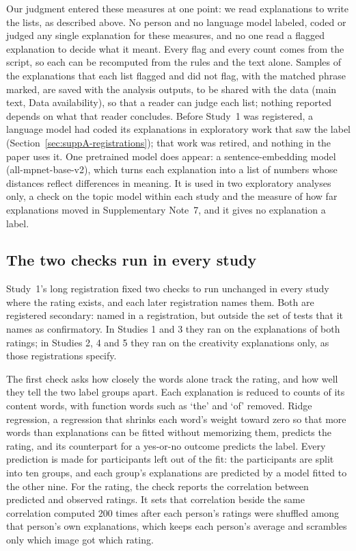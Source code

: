 Our judgment entered these measures at one point: we read explanations to write the lists, as described above. No person and no language model labeled, coded or judged any single explanation for these measures, and no one read a flagged explanation to decide what it meant. Every flag and every count comes from the script, so each can be recomputed from the rules and the text alone. Samples of the explanations that each list flagged and did not flag, with the matched phrase marked, are saved with the analysis outputs, to be shared with the data (main text, Data availability), so that a reader can judge each list; nothing reported depends on what that reader concludes. Before Study~1 was registered, a language model had coded its explanations in exploratory work that saw the label (Section~\ref{sec:suppA-registrations}); that work was retired, and nothing in the paper uses it. One pretrained model does appear: a sentence-embedding model (all-mpnet-base-v2), which turns each explanation into a list of numbers whose distances reflect differences in meaning.\cite{reimers2019sentencebert,sentencetransformers2021allmpnet} It is used in two exploratory analyses only, a check on the topic model within each study and the measure of how far explanations moved in Supplementary Note~7, and it gives no explanation a label.

\subsection*{The two checks run in every study}

Study~1's long registration fixed two checks to run unchanged in every study where the rating exists, and each later registration names them. Both are registered secondary: named in a registration, but outside the set of tests that it names as confirmatory. In Studies 1 and 3 they ran on the explanations of both ratings; in Studies 2, 4 and 5 they ran on the creativity explanations only, as those registrations specify.

The first check asks how closely the words alone track the rating, and how well they tell the two label groups apart. Each explanation is reduced to counts of its content words, with function words such as `the' and `of' removed. Ridge regression, a regression that shrinks each word's weight toward zero so that more words than explanations can be fitted without memorizing them, predicts the rating, and its counterpart for a yes-or-no outcome predicts the label. Every prediction is made for participants left out of the fit: the participants are split into ten groups, and each group's explanations are predicted by a model fitted to the other nine. For the rating, the check reports the correlation between predicted and observed ratings. It sets that correlation beside the same correlation computed 200 times after each person's ratings were shuffled among that person's own explanations, which keeps each person's average and scrambles only which image got which rating.

